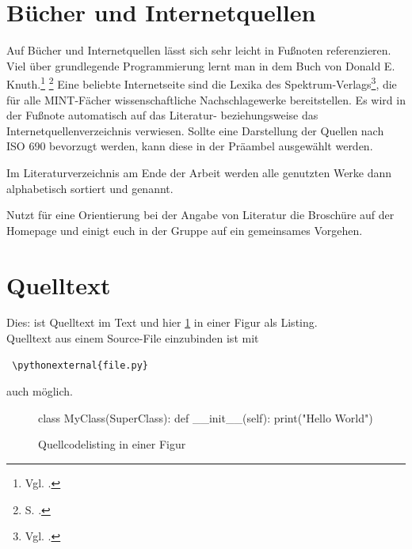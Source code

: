 \section{Bücher und Internetquellen}
Auf Bücher und Internetquellen lässt sich sehr leicht in Fußnoten referenzieren.\\ 
Viel über grundlegende Programmierung lernt man in dem Buch von Donald E. Knuth.\footnote{ Vgl. \cite{book:knuth97}.} \footnote{S. \cite[S. 57]{book:knuth97}.} 
Eine beliebte Internetseite sind die Lexika des Spektrum-Verlags\footnote{ Vgl. \cite{online:spektrumlex}.}, die für alle MINT-Fächer wissenschaftliche Nachschlagewerke bereitstellen.
Es wird in der Fußnote automatisch auf das Literatur- beziehungsweise das Internetquellenverzeichnis verwiesen. 
Sollte eine Darstellung der Quellen nach ISO 690 bevorzugt werden, kann diese in der Präambel ausgewählt werden.

Im Literaturverzeichnis am Ende der Arbeit werden alle genutzten Werke dann alphabetisch sortiert und genannt.

Nutzt für eine Orientierung bei der Angabe von Literatur die Broschüre auf der Homepage und einigt euch in der Gruppe auf ein gemeinsames Vorgehen.

\section{Quelltext}
Dies:  ist Quelltext im Text und hier \ref{listing:code} in einer Figur als Listing.\\
Quelltext aus einem Source-File einzubinden ist mit
\begin{verbatim}
 \pythonexternal{file.py}
\end{verbatim}
auch möglich.

\begin{figure}[h!]
\centering
\begin{python}
class MyClass(SuperClass):
    def __init__(self):
        print("Hello World")
\end{python}
\caption{Quellcodelisting in einer Figur}
\label{listing:code}
\end{figure}